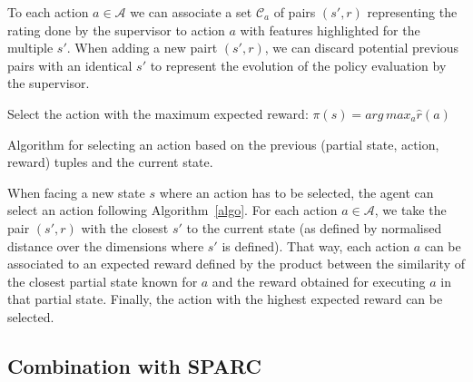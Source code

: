 \documentclass[letterpaper]{article} %
\begin{document}
To each action
$a \in \mathcal{A}$ we can associate a set $\mathcal{C}_{a}$ of pairs $(s',r)$
representing the rating done by the supervisor to action $a$ with features
highlighted for the multiple $s'$. When adding a new pairt $(s',r)$, we can discard potential
previous pairs with an identical $s'$ to represent the evolution of the policy
evaluation by the supervisor.

\begin{algorithm}
    \DontPrintSemicolon
    Select the action with the maximum expected reward:
    $\pi(s) = arg\, max_{a} \hat{r}(a)$

    \caption{Algorithm for selecting an action based on the previous
    (partial state, action, reward) tuples and the current state.}
    \label{algo}
\end{algorithm}


When facing a new state $s$ where an action has to be
selected, the agent can select an action following Algorithm~\ref{algo}. For
each action $a \in \mathcal{A}$, we take the pair $(s',r)$ with the closest $s'$
to the current state (as defined by normalised distance over the dimensions
where $s'$ is defined). That way, each action $a$ can be associated to an
expected reward defined by the product between the similarity of the closest
partial state known for $a$ and the reward obtained for executing $a$ in that partial state.
Finally, the action with the highest expected reward can be selected.


\subsection{Combination with SPARC}
\end{document}
